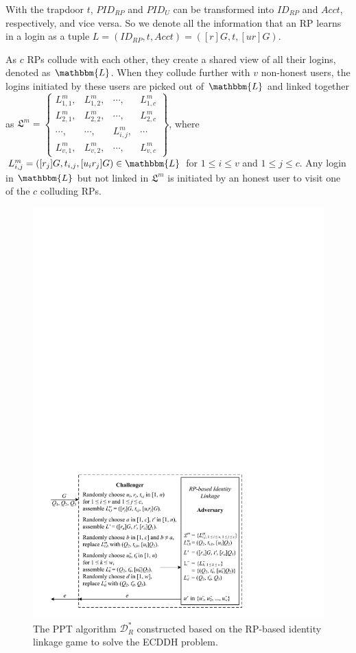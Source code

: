 With the trapdoor $t$, $PID_{RP}$ and $PID_U$ can be transformed into $ID_{RP}$ and $Acct$, respectively, and vice versa.
So we denote all the information that an RP learns in a login as a tuple $L =(ID_{RP}, t, Acct)=([r]G, t, [ur]G)$.

As $c$ RPs collude with each other, they create a shared view of all their logins, denoted as $\mathbbm{L}$.
When they collude further with $v$ non-honest users, the logins initiated by these users are picked out of $\mathbbm{L}$ and linked together as
$\mathfrak{L}^m=\left \{ \begin{matrix}
L^m_{1,1},&L^m_{1,2},&\cdots,&L^m_{1,c}\\
L^m_{2,1},& L^m_{2,2},&\cdots,&L^m_{2,c}\\
\cdots,&\cdots,&L^m_{i,j},&\cdots\\
L^m_{v,1},&L^m_{v,2},&\cdots,&L^m_{v,c}
\end{matrix}\right\}$,
where $L^m_{i, j}=([r_j]G, t_{i,j}, [u_ir_j]G) \in \mathbbm{L}$ for $1 \le i \le v$ and $1 \le j \le c$. Any login in $\mathbbm{L}$ but not linked in $\mathfrak{L}^m$ is initiated by an honest user to visit one of the $c$ colluding RPs.

\begin{figure}[tb]
  \centering
  \includegraphics[width=1.0\linewidth]{fig/rp-linkage-game.pdf}
  \caption{The PPT algorithm $\mathcal{D}^*_R$ constructed based on the RP-based identity linkage game to solve the ECDDH problem.}
  \label{fig:dalgorithm}
\end{figure}


